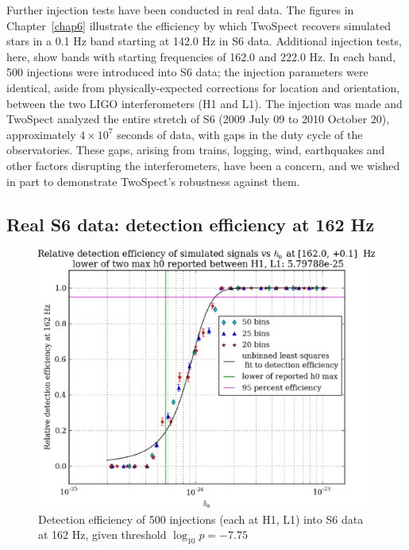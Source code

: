 
Further injection tests have been conducted in real data.
The figures in Chapter~\ref{chap6} illustrate the efficiency by which TwoSpect recovers simulated stars in a 0.1 Hz band starting at 142.0 Hz in S6 data.
Additional injection tests, here, show bands with starting frequencies of 162.0 and 222.0 Hz.
In each band, 500 injections were introduced into S6 data; the injection parameters were identical, aside from physically-expected corrections for location and orientation, between the two LIGO interferometers (H1 and L1).
The injection was made and TwoSpect analyzed the entire stretch of S6 (2009 July 09 to 2010 October 20), approximately $4 \times 10^7$ seconds of data, with gaps in the duty cycle of the observatories.
These gaps, arising from trains, logging, wind, earthquakes and other factors disrupting the interferometers, have been a concern, and we wished in part to demonstrate TwoSpect's robustness against them.


\subsection{Real S6 data: detection efficiency at 162 Hz}

\begin{figure}
\begin{center}
\includegraphics[width=0.70\paperwidth,height=0.48\paperheight]{plots/detectionEfficiencyh0-162-0Hz.eps}
\caption{
Detection efficiency of 500 injections (each at H1, L1) into
S6 data at 162 Hz, given threshold $\log_{10}p = -7.75$}
\label{S6_det_eff_162}
\end{center}
\end{figure}


